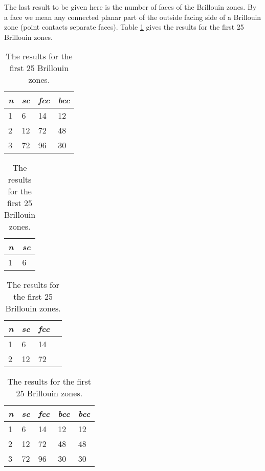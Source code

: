 \documentclass{article}
\begin{document}
The last result to be given here is the number of faces of the Brillouin
zones. By a face we mean any connected planar part of the outside
facing side of a Brillouin zone (point contacts separate faces).
Table \ref{XRef-Table-227124417} gives the results for the first
25 Brillouin zones.
\begin{table}
\caption{The results for the first 25 Brillouin zones.}
\begin{center}
\begin{tabular}{llll}
\textit{n} & \textit{sc} & \textit{fcc} & \textit{bcc}\\
\hline
1 & 6 & 14 & 12\\
2 & 12 & 72 & 48\\
3 & 72 & 96 & 30
\end{tabular}
\end{center}\label{XRef-Table-227124417}
\end{table}
\begin{table}
\caption{The results for the first 25 Brillouin zones.}
\begin{center}
\begin{tabular}{ll}
\textit{n} & \textit{sc}\\
\hline
1 & 6
\end{tabular}
\end{center}
\end{table}
\begin{table}
\caption{The results for the first 25 Brillouin zones.}
\begin{center}
\begin{tabular}{llll}
\textit{n} & \textit{sc} & \textit{fcc}\\
\hline
1 & 6 & 14\\
2 & 12 & 72
\end{tabular}
\end{center}
\end{table}
\begin{table}
\caption{The results for the first 25 Brillouin zones.}
\begin{center}
\begin{tabular}{lllll}
\textit{n} & \textit{sc} & \textit{fcc} & \textit{bcc} & \textit{bcc}\\
\hline
1 & 6 & 14 & 12 & 12\\
2 & 12 & 72 & 48 & 48\\
3 & 72 & 96 & 30 & 30
\end{tabular}
\end{center}
\end{table}
\end{document}
